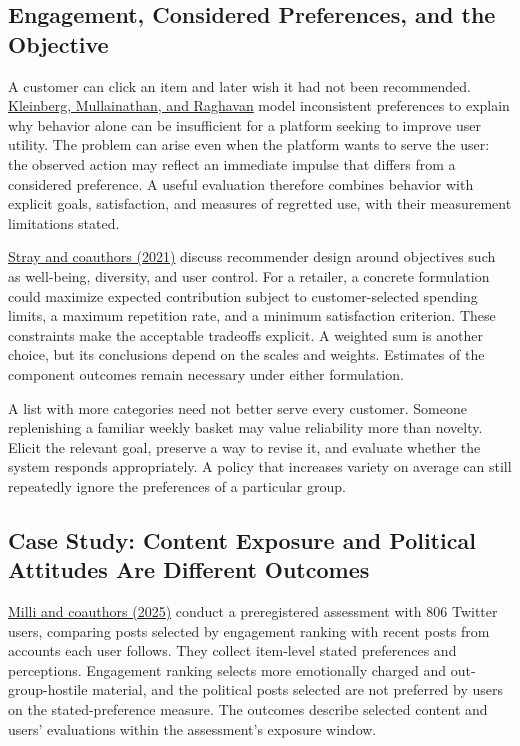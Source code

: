 \hypertarget{M08-engagement-considered-preferences-and-the-objective}{%
\subsection{Engagement, Considered Preferences, and the
Objective}\label{M08-engagement-considered-preferences-and-the-objective}}

\noindent A customer can click an item and later wish it had not been recommended.
\href{https://doi.org/10.1287/mnsc.2022.03683}{Kleinberg, Mullainathan,
and Raghavan} model inconsistent preferences to explain why behavior
alone can be insufficient for a platform seeking to improve user
utility. The problem can arise even when the platform wants to serve the
user: the observed action may reflect an immediate impulse that differs
from a considered preference. A useful evaluation therefore combines
behavior with explicit goals, satisfaction, and measures of regretted
use, with their measurement limitations stated.

\href{https://arxiv.org/abs/2107.10939v1}{Stray and coauthors (2021)}
discuss recommender design around objectives such as well-being,
diversity, and user control. For a retailer, a concrete formulation
could maximize expected contribution subject to customer-selected
spending limits, a maximum repetition rate, and a minimum satisfaction
criterion. These constraints make the acceptable tradeoffs explicit. A
weighted sum is another choice, but its conclusions depend on the scales
and weights. Estimates of the component outcomes remain necessary under
either formulation.

A list with more categories need not better serve every customer.
Someone replenishing a familiar weekly basket may value reliability more
than novelty. Elicit the relevant goal, preserve a way to revise it, and
evaluate whether the system responds appropriately. A policy that
increases variety on average can still repeatedly ignore the preferences
of a particular group.

\hypertarget{M08-case-study-content-exposure-and-political-attitudes-are-different-outcomes}{%
\subsection{Case Study: Content Exposure and Political Attitudes Are
Different
Outcomes}\label{M08-case-study-content-exposure-and-political-attitudes-are-different-outcomes}}

\noindent \href{https://doi.org/10.1093/pnasnexus/pgaf062}{Milli and coauthors
(2025)} conduct a preregistered assessment with 806 Twitter users,
comparing posts selected by engagement ranking with recent posts from
accounts each user follows. They collect item-level stated preferences
and perceptions. Engagement ranking selects more emotionally charged and
out-group-hostile material, and the political posts selected are not
preferred by users on the stated-preference measure. The outcomes
describe selected content and users' evaluations within the assessment's
exposure window.

